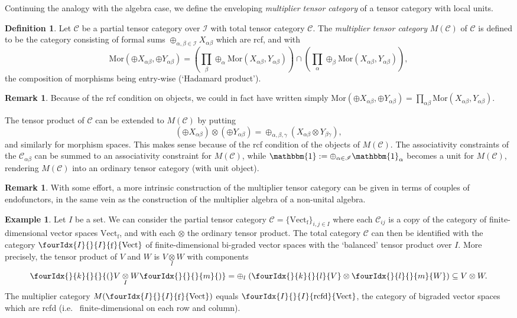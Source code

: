 \documentclass[10pt]{article}
\DeclareMathOperator{\fin}{\mathrm{f}}
\DeclareMathOperator{\rcf}{\mathrm{rcfd}}
\newcommand{\CatC}{\mathcal{C}}
\newcommand{\CatCC}{\mathscr{C}}
\newcommand{\Vectif}{\Gr{\mathrm{Vect}}{I}{I}{}{\fin}}
\newcommand{\Vectrcf}{\Gr{\mathrm{Vect}}{I}{I}{}{\rcf}}
\newcommand{\Mor}{\mathrm{Mor}}
\newcommand{\itimes}{\underset{I}{\otimes}}
\newcommand{\Vect}{\mathrm{Vect}}
\newcommand{\Unitb}{\mathbbm{1}}
\newcommand{\Gr}[5]{\fourIdx{#2}{#4}{#3}{#5}{#1}}%
\newcommand{\Gru}[3]{\Gr{#1}{}{}{#2}{#3}}
\theoremstyle{definition}
\newtheorem{Def}[Theorem]{Definition}
\newtheorem{Rem}[Theorem]{Remark}
\newtheorem{Exa}[Theorem]{Example}
\numberwithin{equation}{section}
\begin{document}
Continuing the analogy with the algebra case, we define the enveloping \emph{multiplier tensor category} of a tensor category with local units. 

\begin{Def} Let $\CatCC$ be a partial tensor category over $\mathscr{I}$ with total tensor category $\CatC$. The \emph{multiplier tensor category} $M(\CatC)$ of $\CatC$ is defined to be the category consisting of formal sums $\oplus_{\alpha,\beta\in \mathscr{I}} X_{\alpha\beta}$ which are rcf, and with \[\Mor(\oplus X_{\alpha\beta},\oplus Y_{\alpha\beta}) = \left(\prod_\beta\oplus_\alpha  \Mor(X_{\alpha\beta},Y_{\alpha\beta}) \right) \cap \left(\prod_\alpha\oplus_\beta \Mor(X_{\alpha\beta},Y_{\alpha\beta})\right),\] the composition of morphisms being entry-wise (`Hadamard product'). 
\end{Def}

\begin{Rem} Because of the rcf condition on objects, we could in fact have written simply $\Mor(\oplus X_{\alpha\beta},\oplus Y_{\alpha\beta}) = \prod_{\alpha\beta} \Mor(X_{\alpha\beta},Y_{\alpha\beta})$. 
\end{Rem} 

The tensor product of $\CatC$ can be extended to $M(\CatC)$ by putting \[\left(\oplus X_{\alpha\beta}\right)\otimes \left(\oplus Y_{\alpha\beta}\right) = \oplus_{\alpha,\beta,\gamma} \left(X_{\alpha\beta}\otimes Y_{\beta\gamma}\right),\] and similarly for morphism spaces. This makes sense because of the rcf condition of the objects of $M(\CatC)$. The associativity constraints of the $\CatC_{\alpha\beta}$ can be summed to an associativity constraint for $M(\CatC)$, while $\Unitb := \oplus_{\alpha\in \mathscr{I}} \Unitb_\alpha$ becomes a unit for $M(\CatC)$, rendering $M(\CatC)$ into an ordinary tensor category (with unit object).

\begin{Rem} With some effort, a more intrinsic construction of the multiplier tensor category can be given in terms of couples of endofunctors, in the same vein as the construction of the multiplier algebra of a non-unital algebra.
\end{Rem} 

\begin{Exa}\label{ExaVectBiGr} Let $I$ be a set. We can consider the partial tensor category $\CatCC = \{\Vect_{\fin}\}_{i,j\in I}$ where each $\CatC_{ij}$ is a copy of the category of finite-dimensional vector spaces $\Vect_{\fin}$, and with each $\otimes$ the ordinary tensor product. The total category $\CatC$ can then be identified with the category $\Vectif$ of finite-dimensional bi-graded vector spaces with the `balanced' tensor product over $I$. More precisely, the tensor product of $V$ and $W$ is $V\itimes W$ with components \[\Gru{(}{k}{}V\itimes W\Gru{)}{}{m} = \oplus_l \;(\Gru{V}{k}{l}\otimes \Gru{W}{l}{m})\subseteq V\otimes W.\] The multiplier category $M(\Vectif)$ equals $\Vectrcf$, the category of bigraded vector spaces which are rcfd (i.e.~ finite-dimensional on each row and column).
\end{Exa}
\end{document}

